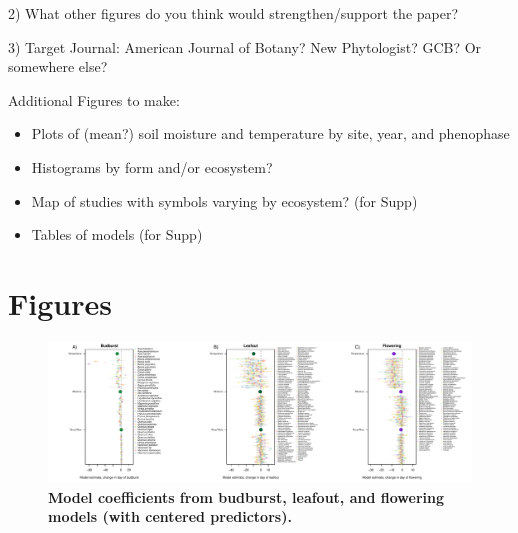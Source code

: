 \documentclass{article}
\begin{document}
2) What other figures do you think would strengthen/support the paper?

3) Target Journal: American Journal of Botany? New Phytologist? GCB? Or somewhere else?

\par Additional Figures to make:
 \begin{itemize}
 \item Plots of (mean?) soil moisture and temperature by site, year, and phenophase
\item Histograms by form and/or ecosystem?
 \item Map of studies with symbols varying by ecosystem? (for Supp)
\item Tables of models (for Supp)
\end{itemize}



\section*{Figures}

\begin{figure}[h]
\centering
 \includegraphics{../../Analyses/soilmoisture/figures/m5_bbdlofl.pdf}
 \caption{\textbf{Model coefficients from budburst, leafout, and flowering models (with centered predictors).}} 
 \label{fig:bblofl}
 \end{figure}
 
 
\end{document}
